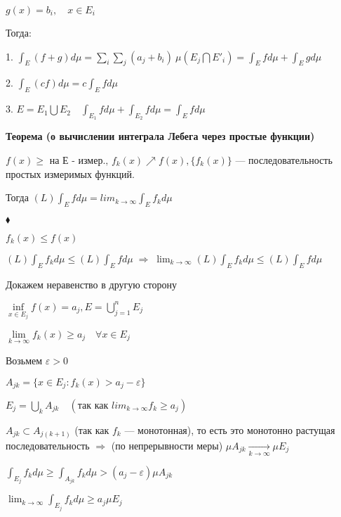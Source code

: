 $g(x) = b_i, \quad x \in E_i$

Тогда:

1. \quad $\int_E (f + g) d \mu = \sum_i \sum_j (a_j + b_i) \: \mu
(E_j \bigcap E'_i) = \int_E f d\mu + \int_E g d\mu$

2. \quad $\int_E (c  f) d\mu = c  \int_E f d\mu$

3. \quad $E = E_1 \bigcup E_2 \quad \int_{E_1} f d\mu + \int_{E_2}
f d\mu = \int_E f d\mu$


\textbf{Теорема (о вычислении интеграла Лебега через простые
функции)} \quad

%
%
%
%
%
%
%
%
%
%
%
%

$f(x) \geqslant \mbox{ на Е - измер., } f_k (x) \nearrow f(x),
\{f_k(x)\}$ --- последовательность простых измеримых функций.

Тогда $(L) \int_E f d\mu = lim_{k \rightarrow \infty} \int_E f_k d
\mu$

$\blacklozenge$

$f_k(x) \leqslant f(x)$

$(L) \int_E f_k d\mu \leqslant (L) \int_E f d\mu \; \Rightarrow \;
\lim_{k \rightarrow \infty} (L) \int_E f_k d\mu \leqslant (L)
\int_E f d\mu$

Докажем неравенство в другую сторону

$\inf\limits_{x \in E_j} f(x) = a_j, E = \bigcup_{j = 1}^n E_j$

$\lim\limits_{k \rightarrow \infty} f_k(x) \geqslant a_j \quad
\forall x \in E_j$

Возьмем $\varepsilon > 0$

$A_{jk} = \{ x \in E_j : f_k(x) > a_j - \varepsilon\}$

$E_j = \bigcup\limits_k A_{jk} \quad (\text{так как } lim_{k
\rightarrow \infty} f_k \geqslant a_j)$

$A_{jk} \subset A_{j(k + 1)}$ (так как $f_k$ --- монотонная), то
есть это монотонно растущая последовательность $\Rightarrow$ (по
непрерывности меры) $\mu A_{jk} \xrightarrow[k \rightarrow
\infty]{} \mu E_j$

$\int_{E_j} f_k d\mu \geqslant \int_{A_{jk}} f_k d\mu > (a_j -
\varepsilon) \mu A_{jk}$

$\lim_{k \rightarrow \infty} \int_{E_j} f_k d\mu \geqslant a_j \mu
E_j$

